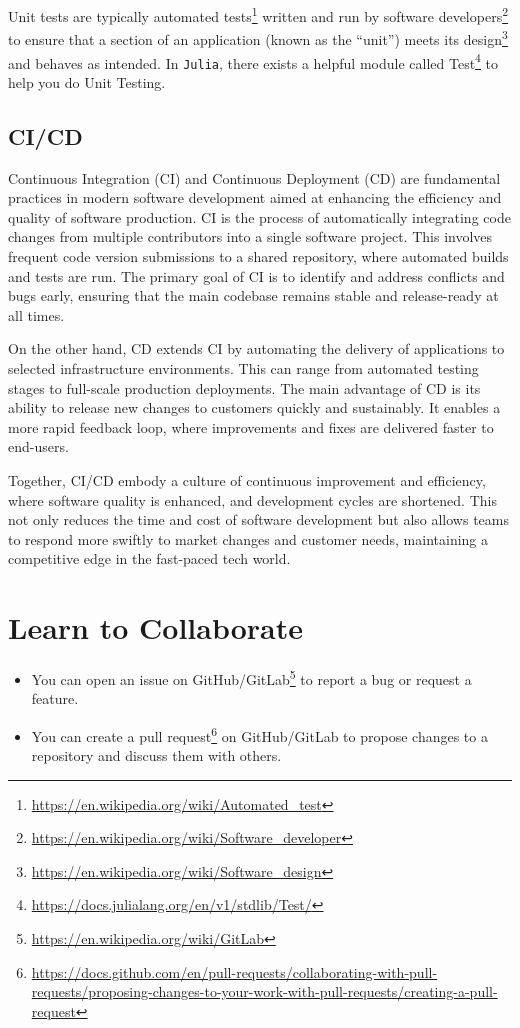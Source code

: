\documentclass[
  notoc %
]{tufte-book}
\DeclareRobustCommand{\href}[2]{#2\footnote{\url{#1}}}
\providecommand{\tightlist}{%
  \setlength{\itemsep}{0pt}\setlength{\parskip}{0pt}
}
\newcommand{\passthrough}[1]{#1}
\begin{document}
Unit tests are typically
\href{https://en.wikipedia.org/wiki/Automated_test}{automated tests}
written and run by
\href{https://en.wikipedia.org/wiki/Software_developer}{software
developers} to ensure that a section of an application (known as the
``unit'') meets its
\href{https://en.wikipedia.org/wiki/Software_design}{design} and behaves
as intended. In \passthrough{\lstinline!Julia!}, there exists a helpful
module called \href{https://docs.julialang.org/en/v1/stdlib/Test/}{Test}
to help you do Unit Testing.

\hypertarget{cicd}{%
\subsection{CI/CD}\label{cicd}}

Continuous Integration (CI) and Continuous Deployment (CD) are
fundamental practices in modern software development aimed at enhancing
the efficiency and quality of software production. CI is the process of
automatically integrating code changes from multiple contributors into a
single software project. This involves frequent code version submissions
to a shared repository, where automated builds and tests are run. The
primary goal of CI is to identify and address conflicts and bugs early,
ensuring that the main codebase remains stable and release-ready at all
times.

On the other hand, CD extends CI by automating the delivery of
applications to selected infrastructure environments. This can range
from automated testing stages to full-scale production deployments. The
main advantage of CD is its ability to release new changes to customers
quickly and sustainably. It enables a more rapid feedback loop, where
improvements and fixes are delivered faster to end-users.

Together, CI/CD embody a culture of continuous improvement and
efficiency, where software quality is enhanced, and development cycles
are shortened. This not only reduces the time and cost of software
development but also allows teams to respond more swiftly to market
changes and customer needs, maintaining a competitive edge in the
fast-paced tech world.

\hypertarget{learn-to-collaborate}{%
\section{Learn to Collaborate}\label{learn-to-collaborate}}

\begin{itemize}
\tightlist
\item
  You can open an issue on
  GitHub/\href{https://en.wikipedia.org/wiki/GitLab}{GitLab} to report a
  bug or request a feature.
\item
  You can create
  \href{https://docs.github.com/en/pull-requests/collaborating-with-pull-requests/proposing-changes-to-your-work-with-pull-requests/creating-a-pull-request}{a
  pull request} on GitHub/GitLab to propose changes to a repository and
  discuss them with others.
\end{itemize}
\end{document}
